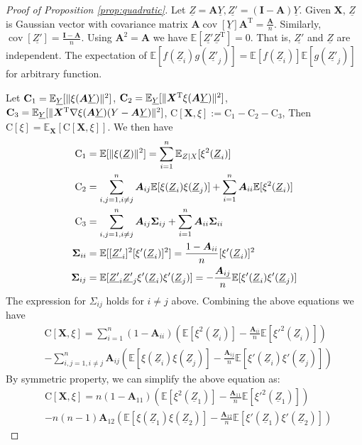 \documentclass[conference]{IEEEtran}
\DeclarePairedDelimiter\norm{\lVert}{\rVert}
\def\E{\mathbb{E}}
\def\T{\mathrm{T}}
\DeclareMathOperator*{\Cov}{cov}
\begin{document}
\begin{proof}[Proof of Proposition \ref{prop:quadratic}]
Let $\underline{Z} = \bm{A}\underline{Y}, \underline{Z'} = (\mathbf{I} - \bm{A})\underline{Y}$. Given $\bm{X}$, $\underline{Z}$ is Gaussian vector with covariance matrix $\bm{A} \Cov[\underline{Y}] \bm{A}^\T = \frac{\bm{A}}{n}$. Similarly, $\Cov[\underline{Z'}] = \frac{\mathbf{I} - \bm{A}}{n}$. Using $\bm{A}^2 = \bm{A}$ we have $\E[\underline{Z'}\underline{Z}^\T] = 0$. That is, $\underline{Z'}$ and $\underline{Z}$ are independent. The expectation of $\E[f(\underline{Z}_i)g(\underline{Z'}_j)] = \E[f(\underline{Z}_i)]\E[g(\underline{Z'}_j)]$ for arbitrary function.
    
Let $\mathbf{C}_1 = \E_{\underline{Y}} [\norm{\xi(\bm{A}\underline{Y})}^2]$, $\mathbf{C}_2 
= \E_{\underline{Y}}
[\norm{\bm{X}^\T\xi(\bm{A}\underline{Y})}^2]$, $\mathbf{C}_3 
= \E_{\underline{Y}}
[\norm{\bm{X}^\T \nabla\xi(\bm{A}\underline{Y})(Y-\bm{A}\underline{Y})}^2]$,
$\mathrm{C}[\bm{X}, \xi] :=  \mathrm{C}_1 - \mathrm{C}_2 - \mathrm{C}_3$, Then $\mathrm{C}[\xi] = \E_{\bm{X}}[\mathrm{C}[\bm{X}, \xi]]$.
We then have
\begin{align*}
    \mathrm{C}_1 &=\E[\norm{\xi(\underline{Z})}^2] = \sum_{i=1}^n \E_{Z|X}[\xi^2(\underline{Z}_i)] \\
    \mathrm{C}_2 &= \sum_{i,j=1, i \neq j}^n \bm{\bm{A}}_{ij}\E[\xi(\underline{Z}_i)\xi(\underline{Z}_j)] +
    \sum_{i=1}^n \bm{\bm{A}}_{ii}  \E[\xi^2(\underline{Z}_i)] \\
    \mathrm{C}_3 & = \sum_{i,j=1, i \neq j}^n \bm{A}_{ij}\bm{\Sigma}_{ij} +
    \sum_{i=1}^n \bm{A}_{ii}\bm{\Sigma}_{ii}    \\
    \bm{\Sigma}_{ii} &=  \E[ [\underline{Z'}_i]^2 [\xi'(\underline{Z}_i)]^2] = \frac{1-\bm{A}_{ii}}{n}[\xi'(\underline{Z}_i)]^2   \\
    \bm{\Sigma}_{ij} &=  \E[\underline{Z'}_i \underline{Z'}_j \xi'(\underline{Z}_i)
    \xi'(\underline{Z}_j)]
     = - \frac{\bm{A}_{ij}}{n} \E[ \xi'(\underline{Z}_i)
    \xi'(\underline{Z}_j)]
\end{align*}
The expression for $\Sigma_{ij}$ holds for $i \neq j$ above. Combining the above equations we have
\begin{align*}
   &  \mathrm{C}[\bm{X}, \xi] = \sum_{i=1}^n (1-\bm{A}_{ii})(\E[\xi^2(\underline{Z}_i)] -
    \frac{ \bm{A}_{ii}}{n} \E[ \xi'^2(\underline{Z}_i)]) \\
    &- \sum_{i,j=1, i \neq j}^n \bm{A}_{ij} (\E[\xi(\underline{Z}_i)\xi(\underline{Z}_j)] -
    \frac{\bm{A}_{ij}}{n}\E[\xi'(\underline{Z}_i) \xi'(\underline{Z}_j)])
\end{align*}
By symmetric property, we can simplify the above equation as:
\begin{align*}
    &  \mathrm{C}[\bm{X}, \xi] =n(1-\bm{A}_{11})(\E[\xi^2(\underline{Z}_1)] -
    \frac{\bm{A}_{11}}{n}  \E[ \xi'^2(\underline{Z}_1)]) \\
    &- n(n-1)\bm{A}_{12}(\E[\xi(\underline{Z}_1)\xi(\underline{Z}_2)] -
    \frac{\bm{A}_{12}}{n}\E[\xi'(\underline{Z}_1)
   \xi'(\underline{Z}_2)])\nonumber
\end{align*}


\end{proof}
\end{document}
